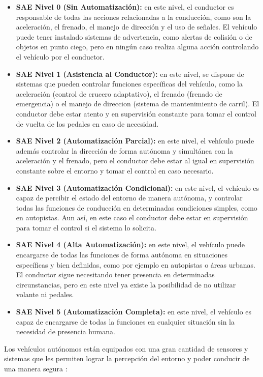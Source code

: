 \documentclass[12pt]{report} %
\begin{document}
\begin{itemize}

    \item \textbf{SAE Nivel 0 (Sin Automatización):} en este nivel, el conductor es responsable de todas las acciones relacionadas a la conducción, como son la aceleración, el frenado, el manejo de dirección y el uso de señales. El vehículo puede tener instalado sistemas de advertencia, como alertas de colisión o de objetos en punto ciego, pero en ningún caso realiza alguna acción controlando el vehículo por el conductor.
    \item \textbf{SAE Nivel 1 (Asistencia al Conductor):} en este nivel, se dispone de sistemas que pueden controlar funciones específicas del vehículo, como la aceleración (control de crucero adaptativo), el frenado (frenado de emergencia) o el manejo de direccion (sistema de mantenimiento de carril). El conductor debe estar atento y en supervisión constante para tomar el control de vuelta de los pedales en caso de necesidad.
    \item \textbf{SAE Nivel 2 (Automatización Parcial):} en este nivel, el vehículo puede además controlar la dirección de forma autónoma y simultánea con la aceleración y el frenado, pero el conductor debe estar al igual en supervisión constante sobre el entorno y tomar el control en caso necesario.
    \item \textbf{SAE Nivel 3 (Automatización Condicional):} en este nivel, el vehículo es capaz de percibir el estado del entorno de manera autónoma, y controlar todas las funciones de conducción en determinadas condiciones simples, como en autopistas. Aun así, en este caso el conductor debe estar en supervisión para tomar el control si el sistema lo solicita.
    \item \textbf{SAE Nivel 4 (Alta Automatización):} en este nivel, el vehículo puede encargarse de todas las funciones de forma autónoma en situaciones específicas y bien definidas, como por ejemplo en autopistas o áreas urbanas. El conductor sigue necesitando tener presencia en determinadas circunstancias, pero en este nivel ya existe la posibilidad de no utilizar volante ni pedales.
    \item \textbf{SAE Nivel 5 (Automatización Completa):} en este nivel, el vehículo es capaz de encargarse de todas la funciones en cualquier situación sin la necesidad de presencia humana.

\end{itemize}

Los vehículos autónomos están equipados con una gran cantidad de sensores y sistemas que les permiten lograr la percepción del entorno y poder conducir de una manera segura 
\cite{autonomousVehicles}:
\end{document}

